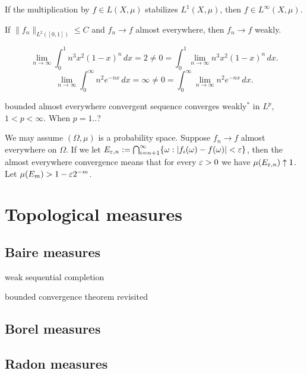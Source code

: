\documentclass{../../large}
\begin{document}
\begin{prb}
If the multiplication by $f\in L(X,\mu)$ stabilizes $L^1(X,\mu)$, then $f\in L^\infty(X,\mu)$.
\end{prb}


\begin{prb}
\end{prb}



If $\|f_n\|_{L^2([0,1])}\le C$ and $f_n\to f$ almost everywhere, then $f_n\to f$ weakly.

\[\lim_{n\to\infty}\int_0^1n^3x^2(1-x)^n\,dx=2\ne0=\int_0^1\lim_{n\to\infty}n^3x^2(1-x)^n\,dx.\]
\[\lim_{n\to\infty}\int_0^\infty n^2e^{-nx}\,dx=\infty\ne0=\int_0^\infty\lim_{n\to\infty}n^2e^{-nx}\,dx.\]




bounded almost everywhere convergent sequence converges weakly$^*$ in $L^p$, $1<p<\infty$.
When $p=1$..?
\begin{pf}
We may assume $(\Omega,\mu)$ is a probability space.
Suppose $f_n\to f$ almost everywhere on $\Omega$.
If we let $E_{\varepsilon,n}:=\bigcap_{i=n+1}^\infty\{\omega:|f_i(\omega)-f(\omega)|<\varepsilon\}$, then the almost everywhere convergence means that for every $\varepsilon>0$ we have $\mu(E_{\varepsilon,n})\uparrow1$.
Let $\mu(E_m)>1-\varepsilon2^{-m}$.
\end{pf}













\chapter{Topological measures}


\section{Baire measures}


weak sequential completion

bounded convergence theorem revisited


\section{Borel measures}


\section{Radon measures}
\end{document}
